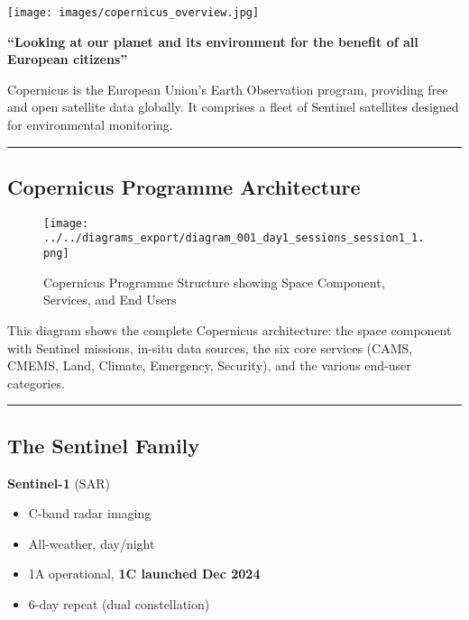 \documentclass[
  letterpaper,
  DIV=11,
  numbers=noendperiod]{scrartcl}
\providecommand{\tightlist}{%
  \setlength{\itemsep}{0pt}\setlength{\parskip}{0pt}}
\begin{document}
\texttt{[image: images/copernicus\_overview.jpg]}

\textbf{``Looking at our planet and its environment for the benefit of
all European citizens''}

Copernicus is the European Union's Earth Observation program, providing
free and open satellite data globally. It comprises a fleet of Sentinel
satellites designed for environmental monitoring.

\begin{center}\rule{0.5\linewidth}{0.5pt}\end{center}

\subsection{Copernicus Programme
Architecture}\label{copernicus-programme-architecture}

\begin{figure}[H]

{\centering \texttt{[image: ../../diagrams\_export/diagram\_001\_day1\_sessions\_session1\_1.png]}

}

\caption{Copernicus Programme Structure showing Space Component,
Services, and End Users}

\end{figure}%

This diagram shows the complete Copernicus architecture: the space
component with Sentinel missions, in-situ data sources, the six core
services (CAMS, CMEMS, Land, Climate, Emergency, Security), and the
various end-user categories.

\begin{center}\rule{0.5\linewidth}{0.5pt}\end{center}

\subsection{The Sentinel Family}\label{the-sentinel-family}

\textbf{Sentinel-1} (SAR)

\begin{itemize}
\tightlist
\item
  C-band radar imaging
\item
  All-weather, day/night
\item
  1A operational, \textbf{1C launched Dec 2024}
\item
  6-day repeat (dual constellation)
\end{itemize}
\end{document}
